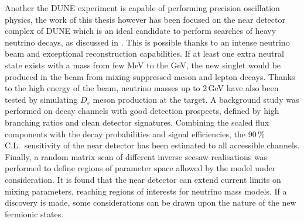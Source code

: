Another the DUNE experiment is capable of performing precision oscillation physics, %
the work of this thesis however has been focused on the near detector complex of DUNE %
which is an ideal candidate to perform searches of heavy neutrino decays, as discussed in .
This is possible thanks to an intense neutrino beam and exceptional reconstruction capabilities.
If at least one extra neutral state exists with a mass from few MeV to the GeV, %
the new singlet would be produced in the beam from mixing-suppressed meson and lepton decays.
Thanks to the high energy of the beam, neutrino masses up to 2\,GeV have also been tested %
by simulating $D_s$ meson production at the target.
A background study was performed on decay channels with good detection prospects, %
defined by high branching ratios and clean detector signatures.
Combining the scaled flux components with the decay probabilities and signal efficiencies, %
the 90\,\% C.L.\ sensitivity of the near detector has been estimated to all accessible channels.
Finally, a random matrix scan of different inverse seesaw realisations was performed %
to define regions of parameter space allowed by the model under consideration.
It is found that the near detector can extend current limits on mixing parameters, %
reaching regions of interests for neutrino mass models.
If a discovery is made, some considerations can be drawn upon the nature of the new fermionic states.


